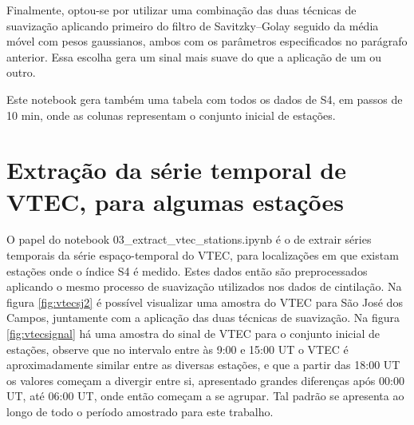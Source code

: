 Finalmente, optou-se por utilizar uma combinação das duas técnicas de suavização aplicando primeiro do filtro de Savitzky–Golay seguido da média móvel com pesos gaussianos, ambos com os parâmetros especificados no parágrafo anterior. Essa escolha gera um sinal mais suave do que a aplicação de um ou outro.

Este notebook gera também uma tabela com todos os dados de S4, em passos de 10 min, onde as colunas representam o conjunto inicial de estações.

\section{Extração da série temporal de VTEC, para algumas estações}

O papel do notebook 03\_extract\_vtec\_stations.ipynb é o de extrair séries temporais da série espaço-temporal do VTEC, para localizações em que existam estações onde o índice S4 é medido. Estes dados então são preprocessados aplicando o mesmo processo de suavização utilizados nos dados de cintilação. Na figura \ref{fig:vtecsj2} é possível visualizar uma amostra do VTEC para São José dos Campos, juntamente com a aplicação das duas técnicas de suavização. Na figura \ref{fig:vtecsignal} há uma amostra do sinal de VTEC para o conjunto inicial de estações, observe que no intervalo entre às 9:00 e 15:00 UT o VTEC é aproximadamente similar entre as diversas estações, e que a partir das 18:00 UT os valores começam a divergir entre si, apresentado grandes diferenças após 00:00 UT, até 06:00 UT, onde então começam a se agrupar. Tal padrão se apresenta ao longo de todo o período amostrado para este trabalho.

